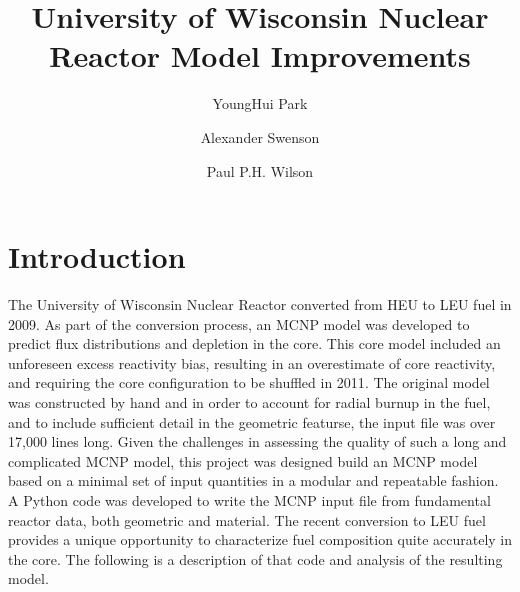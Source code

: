 \documentclass{UWNR_modeling}
\begin{document}
\title{University of Wisconsin Nuclear Reactor Model Improvements}

\author{YoungHui Park}
\author{Alexander Swenson}
\author{Paul P.H. Wilson}
\maketitle

\begin{abstract}



\end{abstract}

\section{Introduction}
The University of Wisconsin Nuclear Reactor converted from HEU to LEU fuel in 2009. As part of the conversion process, an MCNP model was developed to predict flux distributions and depletion in the core. This core model included an unforeseen excess reactivity bias, resulting in an overestimate of core reactivity, and requiring the core configuration to be shuffled in 2011\cite{core_shuffle_report}. The original model was constructed by hand and in order to account for radial burnup in the fuel, and to include sufficient detail in the geometric featurse, the input file was over 17,000 lines long. Given the challenges in assessing the quality of such a long and complicated MCNP model, this project was designed build an MCNP model based on a minimal set of input quantities in a modular and repeatable fashion.  A Python code was developed to write the MCNP input file from fundamental reactor data, both geometric and material. The recent conversion to LEU fuel provides a unique opportunity to characterize fuel composition quite accurately in the core. The following is a description of that code and analysis of the resulting model.
\end{document}
